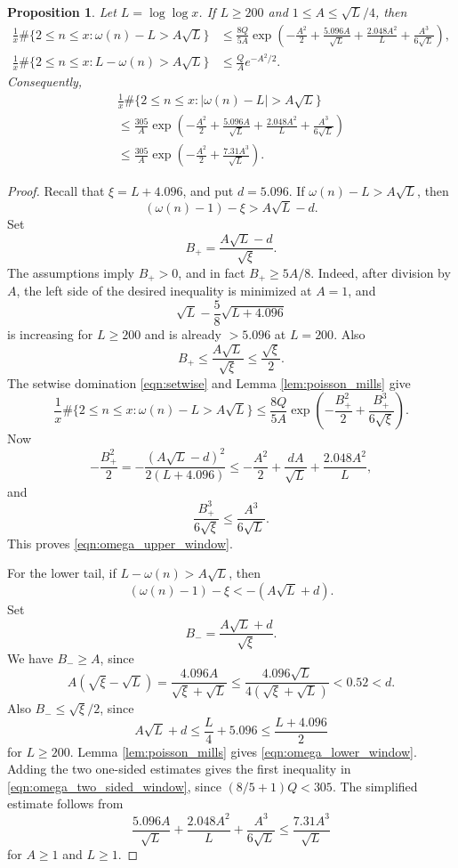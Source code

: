 \documentclass[12pt,a4paper,reqno]{amsart}
\theoremstyle{plain}
\newtheorem{prpstn}[thrm]{Proposition}
\numberwithin{sblmm}{thrm}
\numberwithin{equation}{section}
\begin{document}
\begin{prpstn}\label{prop:gaussian_omega}
    Let $L=\log\log x$. If $L\ge 200$ and $1\le A\le\sqrt{L}/4$, then
    \begin{align}
        \frac{1}{x}\#\{2\le n\le x:\omega(n)-L>A\sqrt{L}\}&\le\frac{8Q}{5A}\exp\left(-\frac{A^2}{2}+\frac{5.096A}{\sqrt{L}}+\frac{2.048A^2}{L}+\frac{A^3}{6\sqrt{L}}\right),\label{eqn:omega_upper_window}\\
        \frac{1}{x}\#\{2\le n\le x:L-\omega(n)>A\sqrt{L}\}&\le\frac{Q}{A}e^{-A^2/2}.\label{eqn:omega_lower_window}
    \end{align}
    Consequently,
    \begin{multline}\label{eqn:omega_two_sided_window}
        \frac{1}{x}\#\{2\le n\le x:|\omega(n)-L|>A\sqrt{L}\}\\
        \le\frac{305}{A}\exp\left(-\frac{A^2}{2}+\frac{5.096A}{\sqrt{L}}+\frac{2.048A^2}{L}+\frac{A^3}{6\sqrt{L}}\right)\\
        \le\frac{305}{A}\exp\left(-\frac{A^2}{2}+\frac{7.31A^3}{\sqrt{L}}\right).
    \end{multline}
\end{prpstn}
\begin{proof}
    Recall that $\xi=L+4.096$, and put $d=5.096$. If $\omega(n)-L>A\sqrt{L}$, then
    $$(\omega(n)-1)-\xi>A\sqrt{L}-d.$$
    Set
    $$B_+=\frac{A\sqrt{L}-d}{\sqrt{\xi}}.$$
    The assumptions imply $B_+>0$, and in fact $B_+\ge 5A/8$. Indeed, after division by $A$, the left side of the desired inequality is minimized at $A=1$, and
    $$\sqrt{L}-\frac{5}{8}\sqrt{L+4.096}$$
    is increasing for $L\ge 200$ and is already $>5.096$ at $L=200$. Also
    $$B_+\le\frac{A\sqrt{L}}{\sqrt{\xi}}\le\frac{\sqrt{\xi}}{2}.$$
    The setwise domination \eqref{eqn:setwise} and Lemma \ref{lem:poisson_mills} give
    $$\frac{1}{x}\#\{2\le n\le x:\omega(n)-L>A\sqrt{L}\}\le\frac{8Q}{5A}\exp\left(-\frac{B_+^2}{2}+\frac{B_+^3}{6\sqrt{\xi}}\right).$$
    Now
    $$-\frac{B_+^2}{2}=-\frac{(A\sqrt{L}-d)^2}{2(L+4.096)}\le -\frac{A^2}{2}+\frac{dA}{\sqrt{L}}+\frac{2.048A^2}{L},$$
    and
    $$\frac{B_+^3}{6\sqrt{\xi}}\le\frac{A^3}{6\sqrt{L}}.$$
    This proves \eqref{eqn:omega_upper_window}.

    For the lower tail, if $L-\omega(n)>A\sqrt{L}$, then
    $$(\omega(n)-1)-\xi<-(A\sqrt{L}+d).$$
    Set
    $$B_- =\frac{A\sqrt{L}+d}{\sqrt{\xi}}.$$
    We have $B_-\ge A$, since
    $$A(\sqrt{\xi}-\sqrt{L})=\frac{4.096A}{\sqrt{\xi}+\sqrt{L}}\le\frac{4.096\sqrt{L}}{4(\sqrt{\xi}+\sqrt{L})}<0.52<d.$$
    Also $B_-\le\sqrt{\xi}/2$, since
    $$A\sqrt{L}+d\le\frac{L}{4}+5.096\le\frac{L+4.096}{2}$$
    for $L\ge 200$. Lemma \ref{lem:poisson_mills} gives \eqref{eqn:omega_lower_window}. Adding the two one-sided estimates gives the first inequality in \eqref{eqn:omega_two_sided_window}, since $(8/5+1)Q<305$. The simplified estimate follows from
    $$\frac{5.096A}{\sqrt{L}}+\frac{2.048A^2}{L}+\frac{A^3}{6\sqrt{L}}\le\frac{7.31A^3}{\sqrt{L}}$$
    for $A\ge 1$ and $L\ge 1$.
\end{proof}
\end{document}
